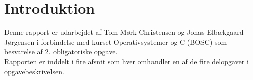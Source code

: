 \documentclass{article}
\begin{document}

\tableofcontents
\pagebreak

\section{Introduktion}
Denne rapport er udarbejdet af Tom Mørk Christensen og Jonas Elbækgaard Jørgensen i forbindelse med kurset Operativsystemer og C (BOSC) som besvarelse af 2. obligatoriske opgave.\\

Rapporten er inddelt i fire afsnit som hver omhandler en af de fire delopgaver i opgavebeskrivelsen. 


\pagebreak

\pagebreak

\pagebreak

\pagebreak


\end{document}
